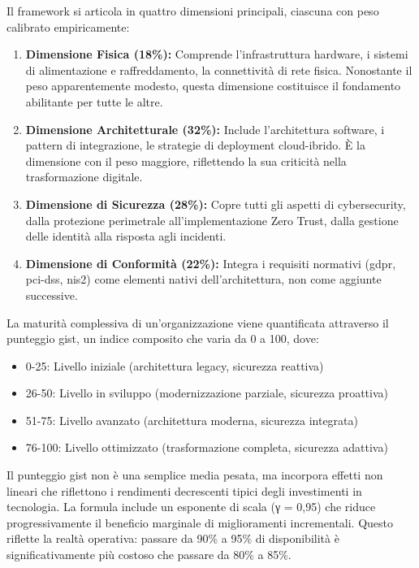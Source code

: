 Il framework si articola in quattro dimensioni principali, ciascuna con peso calibrato empiricamente:

\begin{enumerate}
\item \textbf{Dimensione Fisica (18\%):} Comprende l'infrastruttura hardware, i sistemi di alimentazione e raffreddamento, la connettività di rete fisica. Nonostante il peso apparentemente modesto, questa dimensione costituisce il fondamento abilitante per tutte le altre.

\item \textbf{Dimensione Architetturale (32\%):} Include l'architettura software, i pattern di integrazione, le strategie di deployment cloud-ibrido. È la dimensione con il peso maggiore, riflettendo la sua criticità nella trasformazione digitale.

\item \textbf{Dimensione di Sicurezza (28\%):} Copre tutti gli aspetti di cybersecurity, dalla protezione perimetrale all'implementazione Zero Trust, dalla gestione delle identità alla risposta agli incidenti.

\item \textbf{Dimensione di Conformità (22\%):} Integra i requisiti normativi (\gls{gdpr}, \gls{pci-dss}, \gls{nis2}) come elementi nativi dell'architettura, non come aggiunte successive.
\end{enumerate}

La maturità complessiva di un'organizzazione viene quantificata attraverso il punteggio \gls{gist}, un indice composito che varia da 0 a 100, dove:
\begin{itemize}
\item 0-25: Livello iniziale (architettura legacy, sicurezza reattiva)
\item 26-50: Livello in sviluppo (modernizzazione parziale, sicurezza proattiva)
\item 51-75: Livello avanzato (architettura moderna, sicurezza integrata)
\item 76-100: Livello ottimizzato (trasformazione completa, sicurezza adattiva)
\end{itemize}

\begin{tcolorbox}[
    colback=blue!5!white,
    colframe=blue!75!black,
    title={\textbf{Nota Metodologica:} Calcolo del Punteggio GIST},
    fonttitle=\bfseries
]
Il punteggio \gls{gist} non è una semplice media pesata, ma incorpora effetti non lineari che riflettono i rendimenti decrescenti tipici degli investimenti in tecnologia. La formula include un esponente di scala (γ = 0,95) che riduce progressivamente il beneficio marginale di miglioramenti incrementali. Questo riflette la realtà operativa: passare da 90\% a 95\% di disponibilità è significativamente più costoso che passare da 80\% a 85\%.
\end{tcolorbox}

